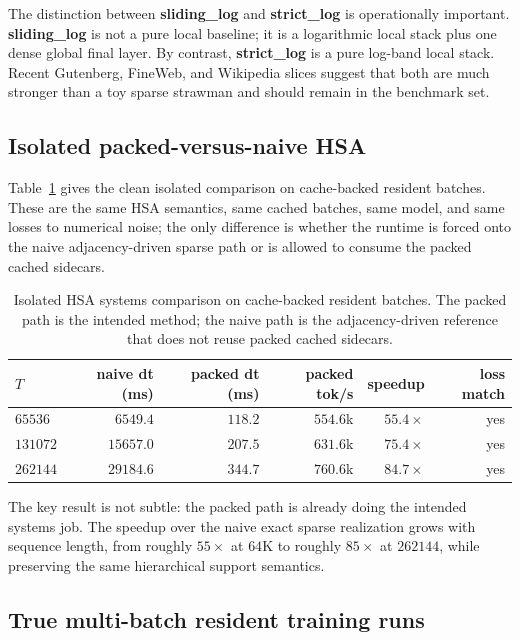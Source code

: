 \documentclass[11pt]{article}
\begin{document}
The distinction between \textbf{sliding\_log} and \textbf{strict\_log} is
operationally important. \textbf{sliding\_log} is not a pure local baseline; it
is a logarithmic local stack plus one dense global final layer. By contrast,
\textbf{strict\_log} is a pure log-band local stack. Recent Gutenberg, FineWeb,
and Wikipedia slices suggest that both are much stronger than a toy sparse
strawman and should remain in the benchmark set.

\subsection{Isolated packed-versus-naive HSA}

Table~\ref{tab:isolated-packed-vs-naive} gives the clean isolated comparison on
cache-backed resident batches. These are the same HSA semantics, same cached
batches, same model, and same losses to numerical noise; the only difference is
whether the runtime is forced onto the naive adjacency-driven sparse path or is
allowed to consume the packed cached sidecars.

\begin{table}[ht]
\centering
\begin{tabular}{lrrrrr}
\toprule
$T$ & naive dt (ms) & packed dt (ms) & packed tok/s & speedup & loss match \\
\midrule
$65536$ & $6549.4$ & $118.2$ & $554.6$k & $55.4\times$ & yes \\
$131072$ & $15657.0$ & $207.5$ & $631.6$k & $75.4\times$ & yes \\
$262144$ & $29184.6$ & $344.7$ & $760.6$k & $84.7\times$ & yes \\
\bottomrule
\end{tabular}
\caption{Isolated HSA systems comparison on cache-backed resident batches. The
packed path is the intended method; the naive path is the adjacency-driven
reference that does not reuse packed cached sidecars.}
\label{tab:isolated-packed-vs-naive}
\end{table}

The key result is not subtle: the packed path is already doing the intended
systems job. The speedup over the naive exact sparse realization grows with
sequence length, from roughly $55\times$ at $64$K to roughly $85\times$ at
$262144$, while preserving the same hierarchical support semantics.

\subsection{True multi-batch resident training runs}
\end{document}
